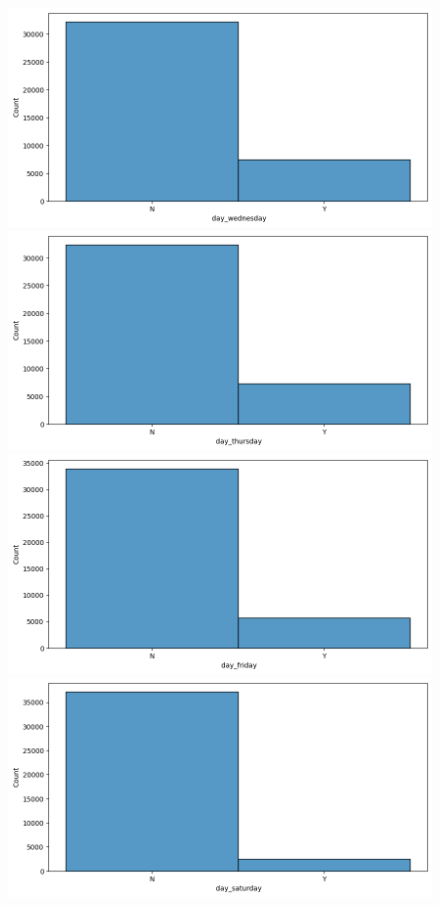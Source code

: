 \documentclass{article}
\begin{document}
\begin{figure}[htb]
    \centering
    \includegraphics[scale=0.33]{news_popularity/analysis/categorical/day_wednesday.png}
    \includegraphics[scale=0.33]{news_popularity/analysis/categorical/day_thursday.png}
    \includegraphics[scale=0.33]{news_popularity/analysis/categorical/day_friday.png}
    \includegraphics[scale=0.33]{news_popularity/analysis/categorical/day_saturday.png}

\end{figure}
\end{document}
